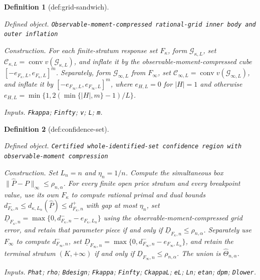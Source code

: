 \documentclass{article}
\newtheorem{definition}{Definition}
\begin{document}
\begin{definition}[def:grid-sandwich]\label{def:grid-sandwich}
\par\smallskip\noindent\emph{Defined object.} \texttt{Observable-\allowbreak{}moment-\allowbreak{}compressed rational-\allowbreak{}grid inner body and outer inflation}
\par\smallskip\noindent\emph{Construction.} For each finite-stratum response set \(F_\kappa\), form \(\mathcal G_{\kappa,L}\), set \(\mathcal C_{\kappa,L}=\operatorname{conv}v(\mathcal G_{\kappa,L})\), and inflate it by the observable-moment-compressed cube \([-e_{F_\kappa,L},e_{F_\kappa,L}]^m\).  Separately, form \(\mathcal G_{\infty,L}\) from \(F_\infty\), set \(\mathcal C_{\infty,L}=\operatorname{conv}v(\mathcal G_{\infty,L})\), and inflate it by \([-e_{F_\infty,L},e_{F_\infty,L}]^m\), where \(e_{H,L}=0\) for \(|H|=1\) and otherwise \(e_{H,L}=\min\{1,2(\min\{|H|,m\}-1)/L\}\).
\par\smallskip\noindent\emph{Inputs.} \texttt{Fkappa}; \texttt{Finfty}; \texttt{v}; \texttt{L}; \texttt{m}.
\end{definition}

\begin{definition}[def:confidence-set]\label{def:confidence-set}
\par\smallskip\noindent\emph{Defined object.} \texttt{Certified whole-\allowbreak{}identified-\allowbreak{}set confidence region with observable-\allowbreak{}moment compression}
\par\smallskip\noindent\emph{Construction.} Set \(L_n=n\) and \(\eta_n=1/n\).  Compute the simultaneous box \(\|\widehat P-P\|_\infty\le\rho_{n,\alpha}\).  For every finite open price stratum and every breakpoint value, use its own \(F_\kappa\) to compute rational primal and dual bounds \(d^-_{F_\kappa,n}\le d_{\kappa,L_n}(\widehat P)\le d^+_{F_\kappa,n}\) with gap at most \(\eta_n\), set \(\underline D_{F_\kappa,n}=\max\{0,d^-_{F_\kappa,n}-e_{F_\kappa,L_n}\}\) using the observable-moment-compressed grid error, and retain that parameter piece if and only if \(\underline D_{F_\kappa,n}\le\rho_{n,\alpha}\).  Separately use \(F_\infty\) to compute \(d^-_{F_\infty,n}\), set \(\underline D_{F_\infty,n}=\max\{0,d^-_{F_\infty,n}-e_{F_\infty,L_n}\}\), and retain the terminal stratum \((K,+\infty)\) if and only if \(\underline D_{F_\infty,n}\le\rho_{n,\alpha}\).  The union is \(\widehat\Theta_{n,\alpha}\).
\par\smallskip\noindent\emph{Inputs.} \texttt{Phat}; \texttt{rho}; \texttt{Bdesign}; \texttt{Fkappa}; \texttt{Finfty}; \texttt{CkappaL}; \texttt{eL}; \texttt{Ln}; \texttt{etan}; \texttt{dpm}; \texttt{Dlower}.
\end{definition}
\end{document}
